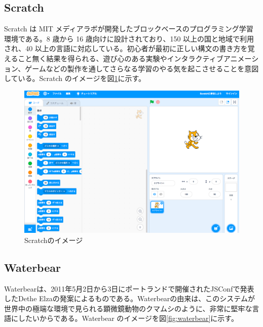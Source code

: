 \documentclass{risepaper}
\begin{document}
    \subsection{Scratch}
 
Scratch\cite{Scratch} は MIT メディアラボが開発したブロックベースのプログラミング学習環境である。8 歳から 16 歳向けに設計されており、150 以上の国と地域で利用され、40 以上の言語に対応している。初心者が最初に正しい構文の書き方を覚えること無く結果を得られる、遊び心のある実験やインタラクティブアニメーション、ゲームなどの製作を通してさらなる学習のやる気を起こさせることを意図している。Scratch のイメージを図\ref{fig:scratch}に示す。 

\begin{figure}[h]
\begin{center}
\includegraphics[scale=0.3]{img/scratch.png}
\caption{Scratchのイメージ}%
\label{fig:scratch}
\end{center}%
\end{figure}%

	\subsection{Waterbear}
    
Waterbear\cite{waterbear}は、2011年5月2日から3日にポートランドで開催されたJSConfで発表したDethe Elzaの発案によるものである。Waterbearの由来は、このシステムが世界中の極端な環境で見られる顕微鏡動物のクマムシのように、非常に堅牢な言語にしたいからである。Waterbear のイメージを図\ref{fig:waterbear}に示す。 
\end{document}
